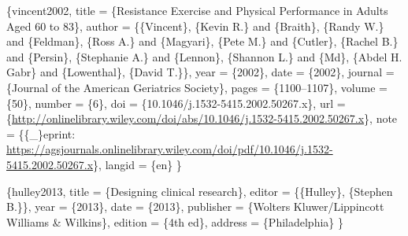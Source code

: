 \documentclass[
]{book}
\begin{document}
\citet{article}\{vincent2002,
title = \{Resistance Exercise and Physical Performance in Adults Aged 60 to 83\},
author = \{\{Vincent\}, \{Kevin R.\} and \{Braith\}, \{Randy W.\} and \{Feldman\}, \{Ross A.\} and \{Magyari\}, \{Pete M.\} and \{Cutler\}, \{Rachel B.\} and \{Persin\}, \{Stephanie A.\} and \{Lennon\}, \{Shannon L.\} and \{Md\}, \{Abdel H. Gabr\} and \{Lowenthal\}, \{David T.\}\},
year = \{2002\},
date = \{2002\},
journal = \{Journal of the American Geriatrics Society\},
pages = \{1100--1107\},
volume = \{50\},
number = \{6\},
doi = \{10.1046/j.1532-5415.2002.50267.x\},
url = \{\url{http://onlinelibrary.wiley.com/doi/abs/10.1046/j.1532-5415.2002.50267.x}\},
note = \{\{\_\}eprint: \url{https://agsjournals.onlinelibrary.wiley.com/doi/pdf/10.1046/j.1532-5415.2002.50267.x}\},
langid = \{en\}
\}

\citet{book}\{hulley2013,
title = \{Designing clinical research\},
editor = \{\{Hulley\}, \{Stephen B.\}\},
year = \{2013\},
date = \{2013\},
publisher = \{Wolters Kluwer/Lippincott Williams \& Wilkins\},
edition = \{4th ed\},
address = \{Philadelphia\}
\}

  
\end{document}
